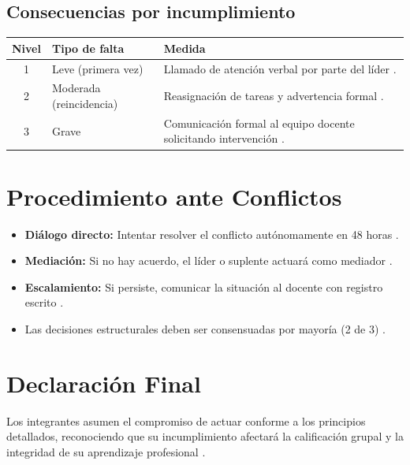 \documentclass[11pt, a4paper]{article}
\begin{document}
\subsection{Consecuencias por incumplimiento}
\begin{table}[h!]
\centering
\begin{tabularx}{\textwidth}{clX}
\toprule
\textbf{Nivel} & \textbf{Tipo de falta} & \textbf{Medida} \\
\midrule
1 & Leve (primera vez) & Llamado de atención verbal por parte del líder \cite{95}. \\
2 & Moderada (reincidencia) & Reasignación de tareas y advertencia formal \cite{95}. \\
3 & Grave & Comunicación formal al equipo docente solicitando intervención \cite{95}. \\
\bottomrule
\end{tabularx}
\end{table}

\section{Procedimiento ante Conflictos}
\begin{itemize}
    \item \textbf{Diálogo directo:} Intentar resolver el conflicto autónomamente en 48 horas \cite{98}.
    \item \textbf{Mediación:} Si no hay acuerdo, el líder o suplente actuará como mediador \cite{99, 100}.
    \item \textbf{Escalamiento:} Si persiste, comunicar la situación al docente con registro escrito \cite{101}.
    \item Las decisiones estructurales deben ser consensuadas por mayoría (2 de 3) \cite{102}.
\end{itemize}

\section{Declaración Final}
Los integrantes asumen el compromiso de actuar conforme a los principios detallados, reconociendo que su incumplimiento afectará la calificación grupal y la integridad de su aprendizaje profesional \cite{108, 109}.
\end{document}
